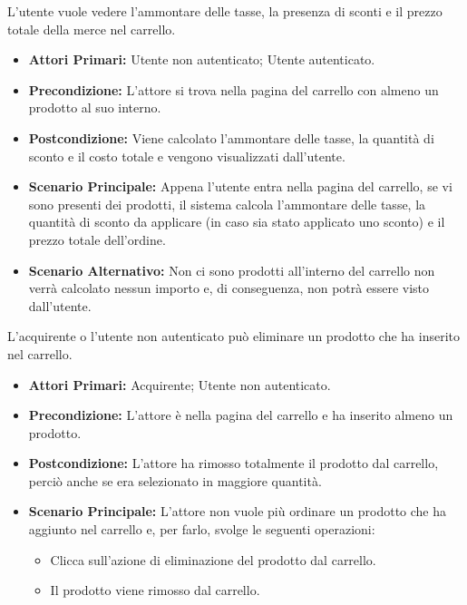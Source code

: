 \resetSubUC

L'utente vuole vedere l'ammontare delle tasse, la presenza di sconti e il prezzo totale della merce nel carrello.
\begin{itemize}
    \item \textbf{Attori Primari:} Utente non autenticato; Utente autenticato.
    \item \textbf{Precondizione:} L'attore si trova nella pagina del carrello con almeno un prodotto al suo interno.
    \item \textbf{Postcondizione:} Viene calcolato l'ammontare delle tasse, la quantità di sconto e il costo totale e vengono visualizzati dall'utente.
    \item \textbf{Scenario Principale:} Appena l'utente entra nella pagina del carrello, se vi sono presenti dei prodotti, il sistema calcola l'ammontare delle tasse, la quantità di sconto da applicare (in caso sia stato applicato uno sconto) e il prezzo totale dell'ordine.
    \item \textbf{Scenario Alternativo:} Non ci sono prodotti all'interno del carrello non verrà calcolato nessun importo e, di conseguenza, non potrà essere visto dall'utente.
\end{itemize}

L'acquirente o l'utente non autenticato può eliminare un prodotto che ha inserito nel carrello.
\begin{itemize}
    \item \textbf{Attori Primari:} Acquirente; Utente non autenticato.
    \item \textbf{Precondizione:} L'attore è nella pagina del carrello e ha inserito almeno un prodotto.
    \item \textbf{Postcondizione:} L'attore ha rimosso totalmente il prodotto dal carrello, perciò anche se era selezionato in maggiore quantità.
    \item \textbf{Scenario Principale:} L'attore non vuole più ordinare un prodotto che ha aggiunto nel carrello e, per farlo, svolge le seguenti operazioni:
    \begin{itemize}
        \item Clicca sull'azione di eliminazione del prodotto dal carrello.
        \item Il prodotto viene rimosso dal carrello.
    \end{itemize}
\end{itemize}

